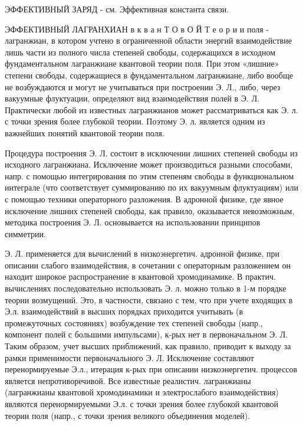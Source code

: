 \documentclass[10pt]{article}
\begin{document}
ЭФФЕКТИВНЫЙ ЗАРЯД - см. Эффективная константа связи.



ЭФФЕКТИВНЫЙ ЛАГРАНХИАН в к в а н Т О в О Й Т $е$ о р и и поля - лагранжиан, в котором учтено в ограниченной области энергий взаимодействие лишь части из полного числа степеней свободы, содержащихся в исходном фундаментальном лагранжиане квантовой теории поля. При этом «лишние» степени свободы, содержащиеся в фундаментальном лагранжиане, либо вообще не возбуждаются и могут не учитываться при построении Э. Л., либо, через вакуумные флуктуации, определяют вид взаимодействия полей в Э. Л. Практически любой из известных лагранжианов может рассматриваться как Э. л. с точки зрения более глубокой теории. Поэтому Э. л. является одним из важнейших понятий квантовой теории поля.



Процедура построения Э. Л. состоит в исключении лишних степеней свободы из исходного лагранжиана. Исключение может производиться разными способами, напр. с помощью интегрирования по этим степеням свободы в функциональном интеграле (что соответствует суммированию по их вакуумным флуктуациям) или с помощью техники операторного разложения. В адронной физике, где явное исключение лишних степеней свободы, как правило, оказывается невозможным, методика построения Э. Л. основывается на использовании принципов симметрии.



Э. Л. применяется для вычислений в низкоэнергетич. адронной физике, при описании слабого взаимодействия, в сочетании с операторным разложением он находит широкое распространение в квантовой хромодинамике. В практич. вычислениях последовательно использовать Э. л. можно только в 1-м порядке теории возмущений. Это, в частности, связано с тем, что при учете входящих в Э.л. взаимодействий в высших порядках приходится учитывать (в промежуточных состояниях) возбуждение тех степеней свободы (напр., компонент полей с большими импульсами), к-рых нет в первоначальном Э. Л. Таким образом, учет высших приближений, как правило, приводит к выходу за рамки применимости первоначального Э. Л. Исключение составляют перенормируемые Э.л., итерация к-рых при описании низкоэнергетич. процессов является непротиворечивой. Все известные реалистич. лагранжианы (лагранжианы квантовой хромодинамики и электрослабого взаимодействия) являются перенормируемыми Э.л. с точки зрения более глубокой квантовой теории поля (напр., с точки зрения великого объединения моделей).
\end{document}

